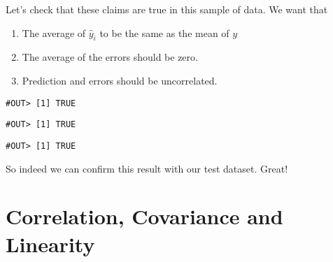 \documentclass[]{book}
\newenvironment{Shaded}{\begin{snugshade}}{\end{snugshade}}
\newcommand{\KeywordTok}[1]{\textcolor[rgb]{0.13,0.29,0.53}{\textbf{#1}}}
\newcommand{\DecValTok}[1]{\textcolor[rgb]{0.00,0.00,0.81}{#1}}
\newcommand{\CommentTok}[1]{\textcolor[rgb]{0.56,0.35,0.01}{\textit{#1}}}
\newcommand{\OperatorTok}[1]{\textcolor[rgb]{0.81,0.36,0.00}{\textbf{#1}}}
\newcommand{\NormalTok}[1]{#1}
\providecommand{\tightlist}{%
  \setlength{\itemsep}{0pt}\setlength{\parskip}{0pt}}
\begin{document}
Let's check that these claims are true in this sample of data. We want
that

\begin{enumerate}
\def\labelenumi{\arabic{enumi}.}
\tightlist
\item
  The average of \(\hat{y}_i\) to be the same as the mean of \(y\)
\item
  The average of the errors should be zero.
\item
  Prediction and errors should be uncorrelated.
\end{enumerate}

\begin{Shaded}
\end{Shaded}

\begin{verbatim}
#OUT> [1] TRUE
\end{verbatim}

\begin{Shaded}
\end{Shaded}

\begin{verbatim}
#OUT> [1] TRUE
\end{verbatim}

\begin{Shaded}
\end{Shaded}

\begin{verbatim}
#OUT> [1] TRUE
\end{verbatim}

So indeed we can confirm this result with our test dataset. Great!

\section{Correlation, Covariance and
Linearity}\label{correlation-covariance-and-linearity}
\end{document}
